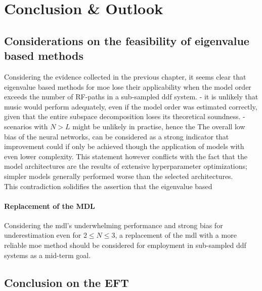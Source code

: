 
\chapter{Conclusion \& Outlook}
\label{ch:conclusion_outlook}

\section{Considerations on the feasibility of eigenvalue based methods}
Considering the evidence collected in the previous chapter, it seems clear that eigenvalue based methods for \gls{moe}
lose their applicability when the model order exceeds the number of RF-paths in a sub-sampled \gls{ddf} system.
- it is unlikely that \gls{music} would perform adequately, even if the model order was estimated correctly, given that
the entire subspace decomposition loses its theoretical soundness.
- scenarios with \( N > L \) might be unlikely in practise, hence the
The overall low bias of the neural networks, can be considered as a strong indicator that improvement could if only be achieved
though the application of models with even lower complexity. This statement however conflicts with the fact that the model
architectures are the results of extensive hyperparameter optimizations; simpler models generally performed worse than
the selected architectures. \\
This contradiction solidifies the assertion that the eigenvalue based





\subsubsection{Replacement of the MDL}
Considering the \gls{mdl}'s underwhelming performance and strong bias for underestimation even for \( 2 \leq N \leq 3 \),
a replacement of the \gls{mdl} with a more reliable \gls{moe} method should be considered for employment in sub-sampled \gls{ddf}
systems as a mid-term goal. \\





\section{Conclusion on the EFT}

